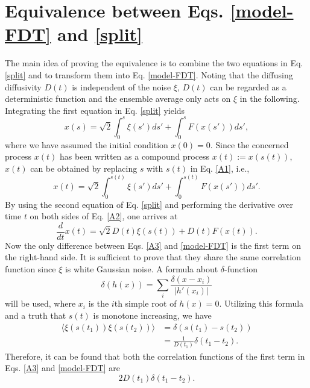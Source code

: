 \documentclass[aps,pre,twocolumn,groupedaddress,longbibliography]{revtex4-2}
\begin{document}
\section{Equivalence between Eqs. \eqref{model-FDT} and \eqref{split}}\label{App1}
The main idea of proving the equivalence is to combine the two equations in Eq. \eqref{split} and to transform them into Eq. \eqref{model-FDT}. Noting that the diffusing diffusivity $D(t)$ is independent of the noise $\xi$, $D(t)$ can be regarded as a deterministic function and the ensemble average only acts on $\xi$ in the following.
Integrating the first equation in Eq. \eqref{split} yields
\begin{equation}\label{A1}
  x(s)=\sqrt{2}\int_0^s\xi(s')ds'+\int_0^sF(x(s'))ds',
\end{equation}
where we have assumed the initial condition $x(0)=0$.
Since the concerned process $x(t)$ has been written as a compound process $x(t):=x(s(t))$, $x(t)$ can be obtained by replacing $s$ with $s(t)$ in Eq. \eqref{A1}, i.e.,
\begin{equation}\label{A2}
  x(t)=\sqrt{2}\int_0^{s(t)}\xi(s')ds'+\int_0^{s(t)}F(x(s'))ds'.
\end{equation}
By using the second equation of Eq. \eqref{split} and performing the derivative over time $t$ on both sides of Eq. \eqref{A2}, one arrives at
\begin{equation}\label{A3}
  \frac{d}{dt}x(t)=\sqrt{2}D(t)\xi(s(t))+D(t)F(x(t)).
\end{equation}
Now the only difference between Eqs. \eqref{A3} and \eqref{model-FDT} is the first term on the right-hand side. It is sufficient to prove that they share the same correlation function since $\xi$ is white Gaussian noise. A formula about $\delta$-function
\begin{equation}
  \delta(h(x))=\sum_{i}\frac{\delta(x-x_i)}{|h'(x_i)|}
\end{equation}
will be used, where $x_i$ is the $i$th simple root of $h(x)=0$. Utilizing this formula and a truth that $s(t)$ is monotone increasing, we have
\begin{equation}
\begin{split}
    \langle\xi(s(t_1))\xi(s(t_2))\rangle
&=\delta(s(t_1)-s(t_2))  \\
&=\frac{1}{D(t_1)}\delta(t_1-t_2).
\end{split}
\end{equation}
Therefore, it can be found that both the correlation functions of the first term in Eqs. \eqref{A3} and \eqref{model-FDT} are
\begin{equation}
  2D(t_1)\delta(t_1-t_2).
\end{equation}
\end{document}

